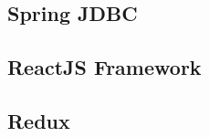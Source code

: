 \subsection{Spring JDBC}
\label{subsection:springJDBC}

\subsection{ReactJS Framework}
\label{section:reactJSFramework}

\subsection{Redux}
\label{section:redux}






\cite{tamingTheStateInReact}
\cite{highPerformanceMySQL}


